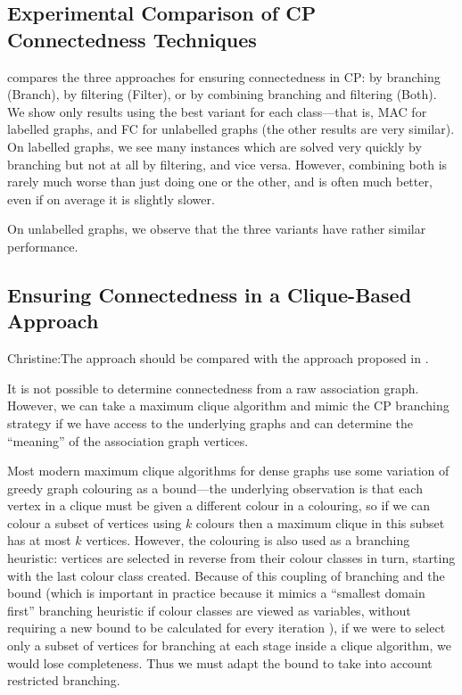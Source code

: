 \documentclass{llncs}
\newcommand{\christine}[1]{{\color{green} Christine:#1}}
\begin{document}
\subsection{Experimental Comparison of CP Connectedness Techniques}\label{mccs-cp-eval}

 compares the three approaches for ensuring connectedness in CP: by
branching (Branch), by filtering (Filter), or by combining branching and filtering (Both). We show
only results using the best variant for each class---that is, MAC for labelled graphs, and FC for
unlabelled graphs (the other results are very similar).  On labelled graphs, we see many instances
which are solved very quickly by branching but not at all by filtering, and vice versa.  However,
combining both is rarely much worse than just doing one or the other, and is often much better, even
if on average it is slightly slower.

On unlabelled graphs, we observe that the three variants have rather similar performance.

\subsection{Ensuring Connectedness in a Clique-Based Approach}\label{mccs-clique}

\christine{The approach should be compared with the approach proposed in \cite{DBLP:conf/mco/VismaraV08}.}

It is not possible to determine connectedness from a raw association graph. However, we can take a
maximum clique algorithm and mimic the CP branching strategy if we have access to the underlying graphs
and can determine the ``meaning'' of the association graph vertices.

Most modern maximum clique algorithms for dense graphs use some variation of greedy graph colouring
as a bound---the underlying observation is that each vertex in a clique must be given a different
colour in a colouring, so if we can colour a subset of vertices using $k$ colours then a maximum
clique in this subset has at most $k$ vertices. However, the colouring is also used as a branching
heuristic: vertices are selected in reverse from their colour classes in turn, starting with the
last colour class created. Because of this coupling of branching and the bound (which is important
in practice because it mimics a ``smallest domain first'' branching heuristic if colour classes are
viewed as variables, without requiring a new bound to be calculated for every iteration
\cite{DBLP:conf/cp/McCreeshP14}), if we were to select only a subset of vertices for branching at
each stage inside a clique algorithm, we would lose completeness. Thus we must adapt the bound to
take into account restricted branching.
\end{document}
